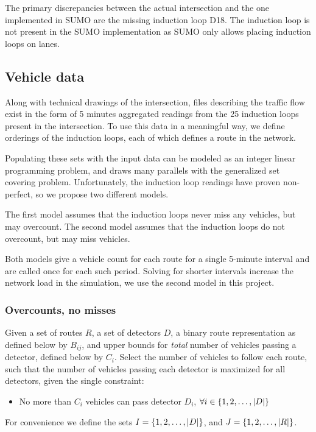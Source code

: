 The primary discrepancies between the actual intersection and the one implemented in SUMO are the missing induction loop D18. The induction loop is not present in the SUMO implementation as SUMO only allows placing induction loops on lanes.

\subsection{Vehicle data}

Along with technical drawings of the intersection, files describing the traffic flow exist in the form of 5 minutes aggregated readings from the 25 induction loops present in the intersection.
To use this data in a meaningful way, we define orderings of the induction loops, each of which defines a route in the network. 

Populating these sets with the input data can be modeled as an integer linear programming problem, and draws many parallels with the generalized set covering problem.
Unfortunately, the induction loop readings have proven non-perfect, so we propose two different models.

The first model assumes that the induction loops never miss any vehicles, but may overcount.
The second model assumes that the induction loops do not overcount, but may miss vehicles. 

Both models give a vehicle count for each route for a single 5-minute interval and are called once for each such period.
Solving for shorter intervals increase the network load in the simulation, we use the second model in this project.

\subsubsection{Overcounts, no misses}
Given a set of routes $R$, a set of detectors $D$, a binary route representation as defined below by $B_{ij}$, and upper bounds for \textit{total} number of vehicles passing a detector, defined below by $C_i$. 
Select the number of vehicles to follow each route, such that the number of vehicles passing each detector is maximized for all detectors, given the single constraint:
\begin{itemize}
  \item No more than $C_i$ vehicles can pass detector $D_i$, $\forall i \in \left\{1, 2, \ldots, |D|\right\}$
\end{itemize}

For convenience we define the sets $I = \left\{1, 2, \ldots, |D|\right\}$, and $J = \left\{1, 2, \ldots, |R|\right\}$.

